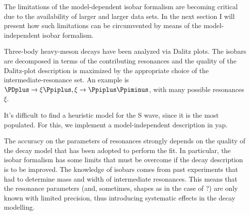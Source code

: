     The limitations of the model-dependent isobar formalism are becoming critical due to the availability of larger and larger data sets.
    In the next section I will present how such limitations can be circumvented by means of the model-independent isobar formalism.


    {\color{red}
    Three-body heavy-meson decays have been analyzed via Dalitz plots.
    The isobars are decomposed in terms of the contributing resonances and the quality of the Dalitz-plot description is maximized by the appropriate choice of the intermediate-resonance set.
    An example is $ \PDplus\to\xi\Ppiplus, \xi\to\Ppiplus\Ppiminus$, with many possible resonances $\xi$.
    }




{\color{red}
It's difficult to find a heuristic model for the S wave, since it is the most populated.
For this, we implement a model-independent description in \ac{yap}.
}

    {\color{red}

    The accuracy on the parameters of resonances strongly depends on the quality of the decay model that has been adopted to perform the fit.
    In particular, the isobar formalism has some limits that must be overcome if the decay description is to be improved.
    The knowledge of isobars comes from past experiments that had to determine mass and width of intermediate resonances.
    This means that the resonance parameters (and, sometimes, shapes as in the case of ?) are only known with limited precision, thus introducing systematic effects in the decay modelling.
    }
